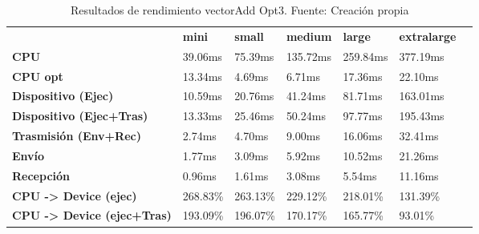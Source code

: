 \begin{table}[H]
    \centering
    \begin{tabular}{lllllll}
    \rowcolor[HTML]{DAE8FC} \ &  \textbf{mini} &  \textbf{small} &  \textbf{medium} &  \textbf{	large} &  \textbf{	extralarge} \\
    \cellcolor[HTML]{DAE8FC} \textbf{CPU} & 39.06ms & 75.39ms & 135.72ms & 	259.84ms & 	377.19ms \\
    \rowcolor[HTML]{EFEFEF} \cellcolor[HTML]{DAE8FC} \textbf{CPU opt} & 13.34ms & 4.69ms & 6.71ms & 	17.36ms & 	22.10ms \\
    \cellcolor[HTML]{DAE8FC} \textbf{Dispositivo (Ejec)} & 10.59ms & 20.76ms & 41.24ms & 	81.71ms & 	163.01ms \\
    \rowcolor[HTML]{EFEFEF} \cellcolor[HTML]{DAE8FC} \textbf{Dispositivo (Ejec+Tras)} & 13.33ms & 25.46ms & 50.24ms & 	97.77ms & 	195.43ms \\
    \cellcolor[HTML]{DAE8FC} \textbf{Trasmisión (Env+Rec)} & 2.74ms & 4.70ms & 9.00ms & 	16.06ms & 	32.41ms \\
    \rowcolor[HTML]{EFEFEF} \cellcolor[HTML]{DAE8FC} \textbf{Envío} & 1.77ms & 3.09ms & 5.92ms & 	10.52ms & 	21.26ms \\
    \cellcolor[HTML]{DAE8FC} \textbf{Recepción} & 0.96ms & 1.61ms & 3.08ms & 	5.54ms & 	11.16ms \\
    \rowcolor[HTML]{EFEFEF} \cellcolor[HTML]{DAE8FC} \textbf{CPU -> Device (ejec)} & 268.83\% & 263.13\% & 229.12\% & 	218.01\% & 	131.39\% \\
    \cellcolor[HTML]{DAE8FC} \textbf{CPU -> Device (ejec+Tras)} & 193.09\% & 196.07\% & 170.17\% & 	165.77\% & 	93.01\% \\
    \end{tabular}
    \caption[Resultados de rendimiento vectorAdd Opt3]{{Resultados de rendimiento vectorAdd Opt3. Fuente: Creación propia}}
    \label{table_test_vectorAdd_Opt3_hw_performanceResults}
\end{table}